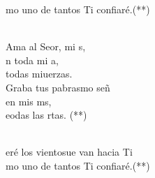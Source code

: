 \begin{cancion}[Hacia Ti][Ixcís]
\begin{chorus}
	mo uno de tantos Ti confiaré.(**)\\
	\end{chorus}%
	\jump\\
	Ama al Seor, mi s, \\
	n toda mi a, \\
	 todas miuerzas.\\
	Graba tus pabrasmo señ  \\
	en mis ms, \\
	eodas las rtas. (**)\\\jump\\
	\begin{chorus}%
	eré los vientosue van hacia Ti\\
	mo uno de tantos Ti confiaré.(**)\\
	\end{chorus}%
	\jump\\
\end{cancion}%
